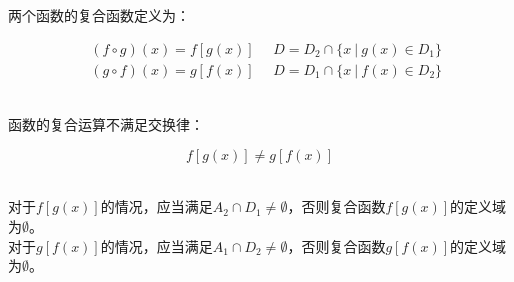 \documentclass[UTF8]{ctexart}
\begin{document}
    两个函数的复合函数定义为：
    \begin{large}
        \begin{align*}
            ~~~~(f\circ g)(x)=f[g(x)]~~~~~~D=D_2\cap\{x~|~g(x)\in D_1\}\\[5mm]
            ~~~~(g\circ f)(x)=g[f(x)]~~~~~~D=D_1\cap\{x~|~f(x)\in D_2\}
        \end{align*}
    \end{large}\\
    函数的复合运算不满足交换律：
    \begin{large}
        \begin{equation*}
            f[g(x)]\neq g[f(x)]
        \end{equation*}
    \end{large}\\
    对于$f[g(x)]$的情况，应当满足$A_2\cap D_1\neq\emptyset$，否则复合函数$f[g(x)]$的定义域为$\emptyset$。\\[3mm]
    对于$g[f(x)]$的情况，应当满足$A_1\cap D_2\neq\emptyset$，否则复合函数$g[f(x)]$的定义域为$\emptyset$。

\newpage
\end{document}
